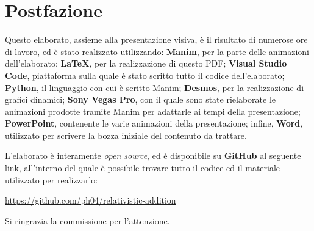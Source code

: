 \documentclass{article}
\begin{document}
\begin{center}
\end{center}

\section{Postfazione}
Questo elaborato, assieme alla presentazione visiva, è il
risultato di numerose ore di lavoro, ed è stato realizzato
utilizzando: \textbf{Manim}, per la parte delle animazioni
dell'elaborato; \textbf{LaTeX}, per la realizzazione di questo
PDF; \textbf{Visual Studio Code}, piattaforma sulla quale
è stato scritto tutto il codice dell'elaborato; \textbf{Python},
il linguaggio con cui è scritto Manim; \textbf{Desmos}, per la
realizzazione di grafici dinamici; \textbf{Sony Vegas Pro},
con il quale sono state rielaborate le animazioni prodotte
tramite Manim per adattarle ai tempi della presentazione;
\textbf{PowerPoint}, contenente le varie animazioni della
presentazione; infine, \textbf{Word}, utilizzato per scrivere
la bozza iniziale del contenuto da trattare.\hfill\break

L'elaborato è interamente \textit{open source},
ed è disponibile su \textbf{GitHub} al seguente link, all'interno
del quale è possibile trovare tutto il codice ed il materiale
utilizzato per realizzarlo:

\url{https://github.com/ph04/relativistic-addition}\hfill\break

Si ringrazia la commissione per l'attenzione.
\end{document}
